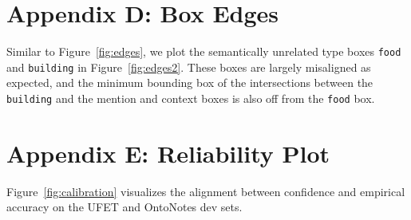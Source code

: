 \documentclass[11pt,a4paper]{article}
\begin{document}
\section*{Appendix D: Box Edges}\label{app:box_overlaps}

Similar to Figure~\ref{fig:edges}, we plot the semantically unrelated type boxes {\tt food} and {\tt building} in Figure~\ref{fig:edges2}. These boxes are largely misaligned as expected, and the minimum bounding box of the intersections between the {\tt building} and the mention and context boxes is also off from the {\tt food} box. 



\section*{Appendix E: Reliability Plot}\label{app:calibration}
Figure~\ref{fig:calibration} visualizes the alignment between confidence and empirical accuracy on the UFET and OntoNotes dev sets. 
\end{document}
